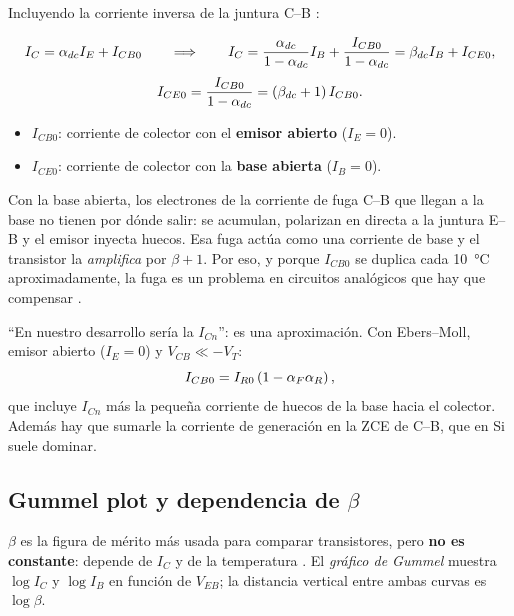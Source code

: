 Incluyendo la corriente inversa de la juntura C--B :

\begin{clave}
\[
  I_C = \alpha_{dc} I_E + I_{CB0}
  \qquad\Longrightarrow\qquad
  I_C = \frac{\alpha_{dc}}{1-\alpha_{dc}}I_B + \frac{I_{CB0}}{1-\alpha_{dc}} = \beta_{dc} I_B + I_{CE0},
\]
\[
  I_{CE0} = \frac{I_{CB0}}{1-\alpha_{dc}} = (\beta_{dc}+1)\,I_{CB0}.
\]
\begin{itemize}[nosep]
  \item $I_{CB0}$: corriente de colector con el \textbf{emisor abierto} ($I_E=0$).
  \item $I_{CE0}$: corriente de colector con la \textbf{base abierta} ($I_B=0$).
\end{itemize}
\end{clave}

\begin{intuicion}
Con la base abierta, los electrones de la corriente de fuga C--B que llegan a la base no
tienen por dónde salir: se acumulan, polarizan en directa a la juntura E--B y el emisor
inyecta huecos. Esa fuga actúa como una corriente de base y el transistor la
\emph{amplifica} por $\beta+1$. Por eso, y porque $I_{CB0}$ se duplica cada \SI{10}{\celsius}
aproximadamente, la fuga es un problema en circuitos analógicos que hay que compensar
.
\end{intuicion}

\begin{ojo}[$I_{CB0}$ \diapo{2.11}]
``En nuestro desarrollo sería la $I_{Cn}$'': es una aproximación. Con Ebers--Moll, emisor
abierto ($I_E=0$) y $V_{CB}\ll-V_T$:
\[
  I_{CB0} = I_{R0}\left(1-\alpha_F\alpha_R\right),
\]
que incluye $I_{Cn}$ más la pequeña corriente de huecos de la base hacia el colector. Además
hay que sumarle la corriente de generación en la ZCE de C--B, que en Si suele dominar.
\end{ojo}

\subsection{Gummel plot y dependencia de $\beta$}

$\beta$ es la figura de mérito más usada para comparar transistores, pero \textbf{no es
constante}: depende de $I_C$ y de la temperatura . El \emph{gráfico de
Gummel} muestra $\log I_C$ y $\log I_B$ en función de $V_{EB}$; la distancia vertical entre
ambas curvas es $\log\beta$.

